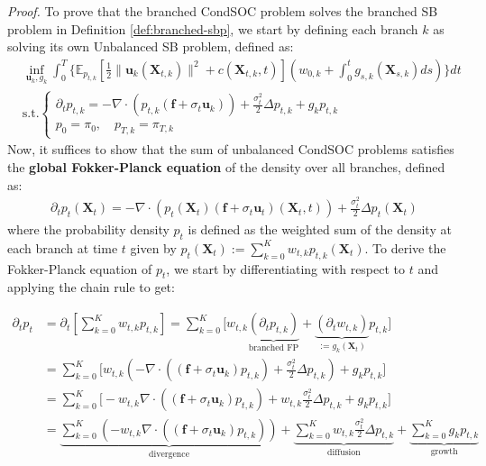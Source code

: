 \documentclass{article}
\begin{document}
\textit{Proof.} To prove that the branched CondSOC problem solves the branched SB problem in Definition \ref{def:branched-sbp}, we start by defining each branch $k$ as solving its own Unbalanced SB problem, defined as:
\begin{align}
    &\inf_{\boldsymbol{u}_{k}, g_{k}}\int_0^T\bigg\{\mathbb{E}_{p_{t,k}}\left[\frac{1}{2}\|\boldsymbol{u}_{k}(\boldsymbol{X}_{t,k})\|^2+c(\boldsymbol{X}_{t,k},t)\right]\left(w_{0,k}+\int_0^tg_{s,k}(\boldsymbol{X}_{s,k}) ds\right)\bigg\}dt\\
    &\text{s.t.}\begin{cases}
        \partial_t p_{t,k}=-\nabla\cdot(p_{t,k}(\boldsymbol{f}+\sigma_t\boldsymbol{u}_{k}))+\frac{\sigma_t^2}{2}\Delta p_{t,k}+g_{k}p_{t,k}\\
        p_0=\pi_0, \quad p_{T,k}=\pi_{T,k}
    \end{cases}
\end{align}
Now, it suffices to show that the sum of unbalanced CondSOC problems satisfies the \textbf{global Fokker-Planck equation} of the density over all branches, defined as: 
\begin{align}
    \partial_tp_t(\boldsymbol{X}_t)=-\nabla\cdot(p_t(\boldsymbol{X}_t)(\boldsymbol{f}+\sigma_t\boldsymbol{u}_t)(\boldsymbol{X}_t,t))+\frac{\sigma_t^2}{2}\Delta p_t(\boldsymbol{X}_t)\label{eq:fpe-full}
\end{align}
where the probability density $p_t$ is defined as the weighted sum of the density at each branch at time $t$ given by $p_t(\boldsymbol{X}_t):=\sum_{k=0}^Kw_{t,k}p_{t,k}(\boldsymbol{X}_t)$. To derive the Fokker-Planck equation of $p_t$, we start by differentiating with respect to $t$ and applying the chain rule to get:
\begin{small}
\begin{align}
    \partial_tp_t&=\partial_t\left[\sum_{k=0}^Kw_{t,k}p_{t,k}\right]=\sum_{k=0}^K\bigg[w_{t,k}\underbrace{\left(\partial_tp_{t,k}\right)}_{\text{branched FP}}+\underbrace{\left(\partial_tw_{t,k}\right)}_{:=g_{k}(\boldsymbol{X}_t)}p_{t,k}\bigg]\nonumber\\
    &=\sum_{k=0}^K\bigg[w_{t,k}\left(-\nabla\cdot ((\boldsymbol{f}+\sigma_t\boldsymbol{u}_{k})p_{t,k})+\frac{\sigma_t^2}{2}\Delta p_{t,k}\right)+g_{k}p_{t,k}\bigg]\nonumber\\
    &=\sum_{k=0}^K\bigg[-w_{t,k}\nabla\cdot((\boldsymbol{f}+\sigma_t\boldsymbol{u}_{k})p_{t,k})+w_{t,k}\frac{\sigma_t^2}{2}\Delta p_{t,k}+g_{k}p_{t,k}\bigg]\nonumber\\
    &=\underbrace{\sum_{k=0}^K(-w_{t,k}\nabla \cdot((\boldsymbol{f}+\sigma_t\boldsymbol{u}_{k})p_{t,k}))}_{\text{divergence}}+\underbrace{\sum_{k=0}^Kw_{t,k}\frac{\sigma_t^2}{2}\Delta p_{t,k}}_{\text{diffusion}}+\underbrace{\sum_{k=0}^K g_{k}p_{t,k}}_{\text{growth}}\label{eq:fpe-three-terms}
\end{align}
\end{small}
\end{document}
